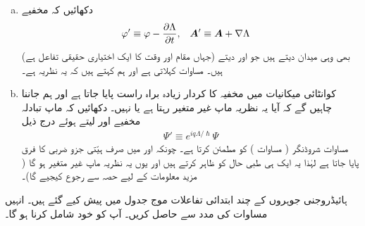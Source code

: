 \begin{enumerate}[a.]
\item 
 دکھائیں کہ مخفیے
\begin{align}\label{مساوات_تین_ابعادی_گیج_تبادلہ}
 \varphi' &\equiv\varphi-\frac{\partial\Lambda}{\partial t}, && {{\boldsymbol{A}}}' \equiv{\ensuremath{{\boldsymbol{A}}}}+\nabla\Lambda
\end{align}
(جہاں  مقام اور وقت کا ایک اختیاری حقیقی تفاعل ہے) بھی وہی میدان دیتے ہیں جو  اور  دیتے ہیں۔
 مساوات  کہلاتی ہے اور ہم کہتے ہیں کہ یہ نظریہ  ہے۔
\item
 کوانٹائی میکانیات میں مخفیہ کا کردار زیادہ براہ راست پایا جاتا ہے اور ہم جاننا چاہیں گے کہ آیا یہ نظریہ ماپ غیر متغیر رہتا ہے یا نہیں۔ دکھائیں کہ ماپ تبادلہ مخفیے  اور  لیتے ہوئے درج ذیل 
\begin{align}
 \Psi'\equiv e^{i q \Lambda/\hslash}\Psi
\end{align}
مساوات شروڈنگر ( مساوات ) کو مطمئن کرتا ہے۔ چونکہ  اور  میں صرف ہیّتی جزو ضربی کا فرق پایا جاتا ہے لہٰذا یہ ایک ہی طبی حال کو ظاہر کرتے ہیں اور یوں یہ نظریہ ماپ غیر متغیر ہو گا ( مزید معلومات کے لیے حصہ سے رجوع کیجیے گا)۔
\end{enumerate}
ہائیڈروجنی جوہروں  کے چند ابتدائی تفاعلات موج جدول  میں پیش کیے گئے ہیں۔ انہیں مساوات  کی مدد سے حاصل کریں۔ آپ کو  خود شامل کرنا ہو گا۔
